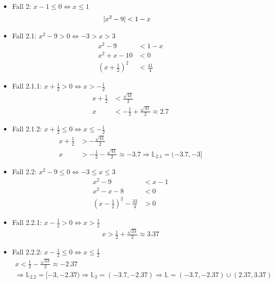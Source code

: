 \documentclass{standalone}
\begin{document}
\begin{itemize}
    \item Fall 2: $x-1 \leq 0 \Leftrightarrow x \leq 1$\begin{align}
        \lvert x^2 - 9\rvert &< 1-x
    \end{align}
    \item Fall 2.1: $x^2-9 > 0 \Leftrightarrow -3 > x > 3$\begin{align}
        x^2 - 9 &< 1 - x \\
        x^2 + x - 10 &< 0 \\
        (x+\frac{1}{2})^2 &< \frac{41}{4}
    \end{align}
    \item Fall 2.1.1: $x+\frac{1}{2} > 0 \Leftrightarrow x > -\frac{1}{2}$\begin{align}
        x+\frac{1}{2} &< \frac{\sqrt{41}}{2} \\
        x &< -\frac{1}{2} + \frac{\sqrt{41}}{2} \approx 2.7
    \end{align}
    \item Fall 2.1.2: $x+\frac{1}{2} \leq 0 \Leftrightarrow x \leq -\frac{1}{2}$\begin{align}
        x+\frac{1}{2} &> -\frac{\sqrt{41}}{2}\\
        x &> -\frac{1}{2} - \frac{\sqrt{41}}{2} \approx -3.7
        \Rightarrow \mathbb{L}_{2.1} = (-3.7,-3]
    \end{align}
    \item Fall 2.2: $x^2-9 \leq 0 \Leftrightarrow -3 \leq x \leq 3$\begin{align}
        x^2 - 9 &< x-1 \\
        x^2 - x -8 &< 0 \\
        (x-\frac{1}{2})^2 -\frac{33}{4} &> 0
    \end{align}
    \item Fall 2.2.1: $x-\frac{1}{2} > 0 \Leftrightarrow x > \frac{1}{2}$\begin{align}
        x > \frac{1}{2}+\frac{\sqrt{33}}{2} \approx 3.37
    \end{align}
    \item Fall 2.2.2: $x-\frac{1}{2} \leq 0 \Leftrightarrow x \leq \frac{1}{2}$\begin{align}
        x < \frac{1}{2}-\frac{\sqrt{33}}{2} \approx -2.37 \\
        \Rightarrow \mathbb{L}_{2.2} = [-3,-2.37)
        \Rightarrow \mathbb{L}_{2} = (-3.7,-2.37)
        \Rightarrow \mathbb{L} = (-3.7,-2.37) \cup (2.37,3.37)
    \end{align}


\end{itemize}
\end{document}
